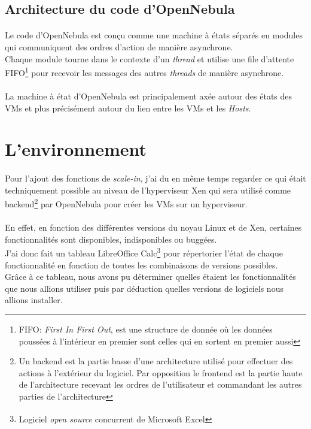 \subsection{Architecture du code d'OpenNebula}
\paragraph*{}
Le code d'OpenNebula est conçu comme une machine à états séparés en modules qui communiquent des ordres d'action de manière asynchrone.
\\
Chaque module tourne dans le contexte d'un \emph{thread} et utilise une file d'attente FIFO\footnote{FIFO: \emph{First In First Out}, est une structure de donnée où les données poussées à l'intérieur
en premier sont celles qui en sortent en premier aussi} pour recevoir les messages des autres \emph{threads} de manière asynchrone.

\paragraph*{}
La machine à état d'OpenNebula est principalement axée autour des états des VMs et plus précisément autour du lien entre les VMs et les \emph{Hosts}.


\section{L'environnement}

\paragraph*{}
Pour l'ajout des fonctions de \emph{scale-in}, j'ai du en même temps regarder ce qui était techniquement possible au niveau de l'hyperviseur Xen qui
sera utilisé comme backend\footnote{Un backend est la partie basse d'une architecture utilisé pour effectuer des actions à l'extérieur du logiciel.
Par opposition le frontend est la partie haute de l'architecture recevant les ordres de l'utilisateur et commandant les autres parties de l'architecture}
par OpenNebula pour créer les VMs sur un hyperviseur.

\paragraph*{}
En effet, en fonction des différentes versions du noyau Linux et de Xen, certaines fonctionnalités sont disponibles, indisponibles ou buggées.\\
J'ai donc fait un tableau LibreOffice Calc\footnote{Logiciel \emph{open source} concurrent de Microsoft\textsuperscript{\textregistered} Excel\texttrademark}
pour répertorier l'état de chaque fonctionnalité en fonction de toutes les combinaisons de versions possibles.
\\
Grâce à ce tableau, nous avons pu déterminer quelles étaient les fonctionnalités que nous allions utiliser puis par déduction quelles versions de logiciels nous
allions installer.

